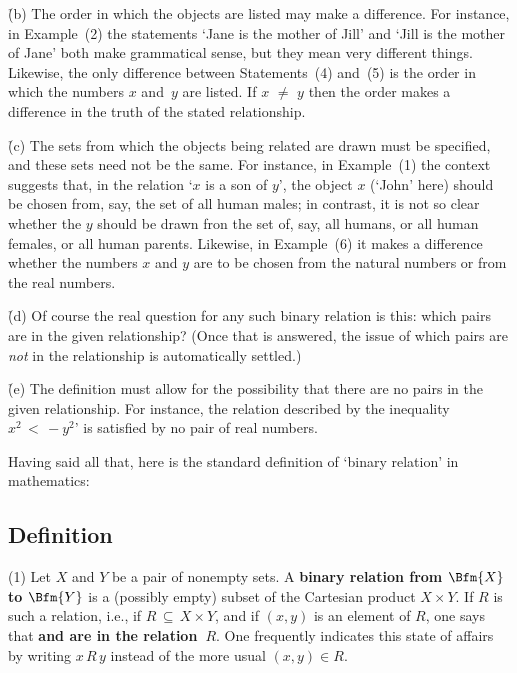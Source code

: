         \h (b) The order in which the objects are listed may make a difference. For instance, in Example~(2)
    the statements `Jane is the mother of Jill' and `Jill is the mother of Jane' both make grammatical sense, but they mean very different things.
    Likewise, the only difference between Statements~(4) and~(5) is the order in which the numbers $x$ and~$y$ are listed.
    If  $x \,\,{\neq}\,\, y$ then the order makes a difference in the truth of the stated relationship.

        \h (c) The sets from which the objects being related are drawn must be specified, and these sets need not be the same.
    For instance, in Example~(1) the context suggests that, in the relation `$x$ is a son of $y$',
    the object $x$ (`John' here) should be chosen from, say, the set of all human males;
    in contrast, it is not so clear whether the $y$ should be drawn fron the set of, say, all humans, or all human females, or all human parents.
    Likewise, in Example~(6) it makes a difference whether the numbers $x$ and $y$ are to be chosen from the natural numbers or from the real numbers.

        \h (d) Of course the real question for any such binary relation is this: which pairs are in the given relationship?
    (Once that is answered, the issue of which pairs are {\em not} in the relationship is automatically settled.)

        \h (e) The definition must allow for the possibility that there are no pairs in the given relationship.
    For instance, the relation described by the inequality $x^{2}\,<\,-y^{2}$' is satisfied by no pair of real numbers.

        Having said all that, here is the standard definition of `binary relation' in mathematics:

\V

        \subsection{\small{{\bf Definition}}}
        \label{DefA12.60}

\V

        (1) Let $X$ and $Y$ be a pair of nonempty sets.
    A {\bf binary relation from $\Bfm{X}$ to $\Bfm{Y}$} is a (possibly empty) subset of the Cartesian product $X{\times}Y$.
    If $R$ is such a relation, i.e., if $R \,{\subseteq}\, X{\times}Y$, and if $(x,y)$ is an element of $R$, one says that {\bf {} and  are in the  relation~$R$}.
    One frequently indicates this state of affairs by writing $x\,R\,y$ instead of the more usual $(x,y){\in}R$.

